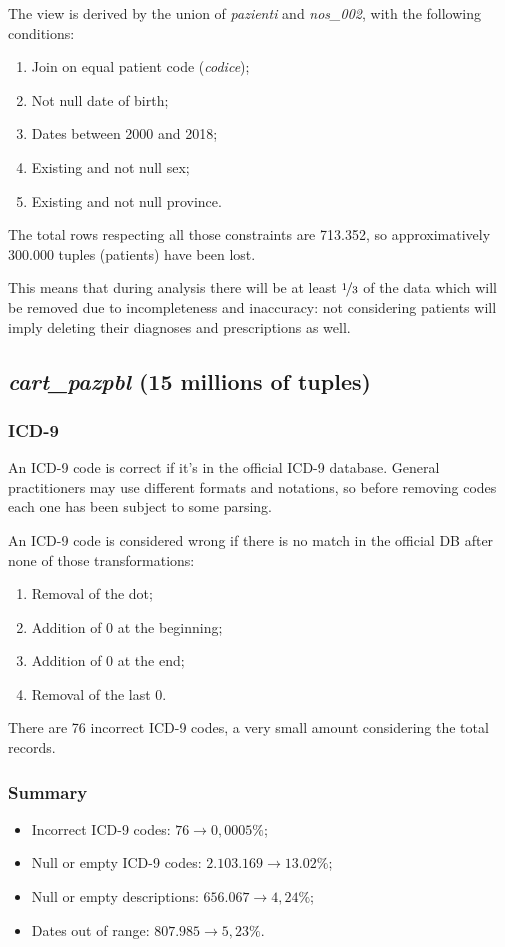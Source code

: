 The view is derived by the union of \textit{pazienti} and \textit{nos\_002}, with the following conditions:
\begin{enumerate}
	\item Join on equal patient code (\textit{codice});
	\item Not null date of birth;
	\item Dates between 2000 and 2018;
	\item Existing and not null sex;
	\item Existing and not null province.
\end{enumerate}

The total rows respecting all those constraints are 713.352, so approximatively 300.000 tuples (patients) have been lost. 

This means that during analysis there will be at least $\nicefrac{1}{3}$ of the data which will be removed due to incompleteness and inaccuracy: not considering patients will imply deleting their diagnoses and prescriptions as well.

\subsection{\textit{cart\_pazpbl} (15 millions of tuples)}
\subsubsection{ICD-9}
An ICD-9 code is correct if it's in the official ICD-9 database\cite{icd9}. General practitioners may use different formats and notations, so before removing codes each one has been subject to some parsing.

An ICD-9 code is considered wrong if there is no match in the official DB after none of those transformations:
\begin{enumerate}
	\item Removal of the dot;
	\item Addition of 0 at the beginning;
	\item Addition of 0 at the end;
	\item Removal of the last 0.
\end{enumerate}

There are 76 incorrect ICD-9 codes, a very small amount considering the total records.

\subsubsection{Summary}
\begin{itemize}
	\item Incorrect ICD-9 codes: $76 \rightarrow 0,0005\%$;
	\item Null or empty ICD-9 codes: $2.103.169 \rightarrow 13.02\%$;
	\item Null or empty descriptions: $656.067 \rightarrow 4,24\%$;
	\item Dates out of range: $807.985 \rightarrow 5,23\%$.
\end{itemize}

